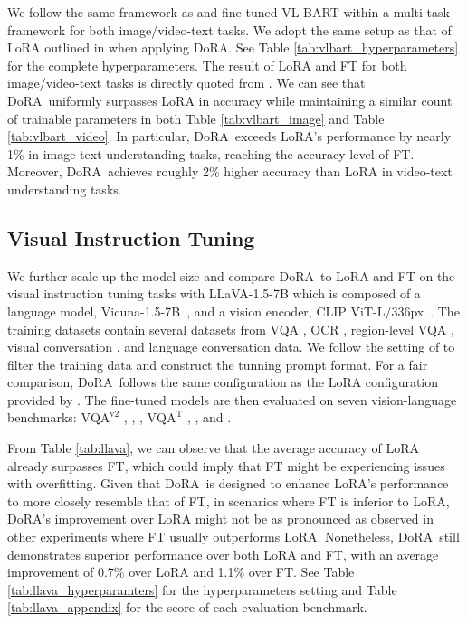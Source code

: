 \documentclass{article}
\newcommand{\ours}{DoRA}
\theoremstyle{plain}
\theoremstyle{definition}
\theoremstyle{remark}
\begin{document}
We follow the same framework as \cite{sung2022vladapter} and fine-tuned VL-BART within a multi-task framework for both image/video-text tasks. We adopt the same setup as that of LoRA outlined in \cite{sung2022vladapter} when applying \ours. See Table \ref{tab:vlbart_hyperparameters} for the complete hyperparameters. The result of LoRA and FT for both image/video-text tasks is directly quoted from \cite{sung2022vladapter}. We can see that \ours~uniformly surpasses LoRA in accuracy while maintaining a similar count of trainable parameters in both Table \ref{tab:vlbart_image} and Table \ref{tab:vlbart_video}. In particular, \ours~exceeds LoRA's performance by nearly 1\% in image-text understanding tasks, reaching the accuracy level of FT. Moreover, \ours~achieves roughly 2\% higher accuracy than LoRA in video-text understanding tasks.

\subsection{Visual Instruction Tuning}

We further scale up the model size and compare \ours~to LoRA and FT on the visual instruction tuning tasks with LLaVA-1.5-7B \cite{liu2023llava} which is composed of a language model, Vicuna-1.5-7B~\cite{peng2023vicuna}, and a vision encoder, CLIP ViT-L/336px~\cite{radford2021clip}. The training datasets contain several datasets from VQA \cite{goyal2017vaqv2, hudson2019gqa, marino2019okvqa, schwenk2022aokvqa}, OCR \cite{mishra2019ocrvqa, sidorov2020textcaps}, region-level VQA \cite{kazemzadeh-etal-2014-referitgame, krishna2016visual, mao2016generation}, visual conversation \cite{liu2023llava}, and language conversation data. We follow the setting of \cite{liu2023llava} to filter the training data and construct the tunning prompt format. For a fair comparison, \ours~follows the same configuration as the LoRA configuration provided by \cite{liu2023llava}. The fine-tuned models are then evaluated on seven vision-language benchmarks: $\text{VQA}^{\text{v2}}$ \cite{goyal2017vaqv2},  \cite{hudson2019gqa},  \cite{gurari2018vizwiz}  \cite{lu2022learn}, $\text{VQA}^{\text{T}}$ \cite{singh2019vqa},  \cite{li2023evaluating}, and  \cite{liu2023mmbench}.

From Table \ref{tab:llava}, we can observe that the average accuracy of LoRA already surpasses FT, which could imply that FT might be experiencing issues with overfitting.
Given that \ours~is designed to enhance LoRA's performance to more closely resemble that of FT, in scenarios where FT is inferior to LoRA, \ours's improvement over LoRA might not be as pronounced as observed in other experiments where FT usually outperforms LoRA. Nonetheless, \ours~still demonstrates superior performance over both LoRA and FT, with an average improvement of 0.7\% over LoRA and 1.1\% over FT. See Table \ref{tab:llava_hyperparamters} for the hyperparameters setting and Table \ref{tab:llava_appendix} for the score of each evaluation benchmark.
\end{document}
